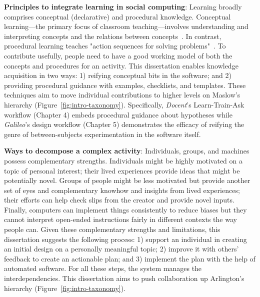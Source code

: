 \textbf{Principles to integrate learning in social computing}: Learning broadly comprises conceptual (declarative) and procedural knowledge. Conceptual learning---the primary focus of classroom teaching---involves understanding and interpreting concepts and the relations between concepts~\cite{arslan2010traditional}. In contrast, procedural learning teaches "action sequences for solving problems"~\cite{rittle1999conceptual}. To contribute usefully, people need to have a good working model of both the concepts and procedures for an activity. This dissertation enables knowledge acquisition in two ways: 1) reifying conceptual bits in the software; and 2) providing procedural guidance with examples, checklists, and templates. These techniques aim to move individual contributions to higher levels on Maslow's hierarchy (Figure~\ref{fig:intro-taxonomy}). 
Specifically, \textit{Docent}'s Learn-Train-Ask workflow (Chapter 4) embeds procedural guidance about hypotheses while \textit{Galileo}'s design workflow (Chapter 5) demonstrates the efficacy of reifying the genre of between-subjects experimentation in the software itself.

\textbf{Ways to decompose a complex activity}: 
Individuals, groups, and machines possess complementary strengths. Individuals might be highly motivated on a topic of personal interest; their lived experiences provide ideas that might be potentially novel. Groups of people might be less motivated but provide another set of eyes and complementary knowhow and insights from lived experiences; their efforts can help check slips from the creator and provide novel inputs. Finally, computers can implement things consistently to reduce biases but they cannot interpret open-ended instructions fairly in different contexts the way people can. Given these complementary strengths and limitations, this dissertation suggests the following process: 1) support an individual in creating an initial design on a personally meaningful topic; 2) improve it with others' feedback to create an actionable plan; and 3) implement the plan with the help of automated software. For all these steps, the system manages the interdependencies. This dissertation aims to push collaboration up Arlington's hierarchy (Figure~\ref{fig:intro-taxonomy}). 

